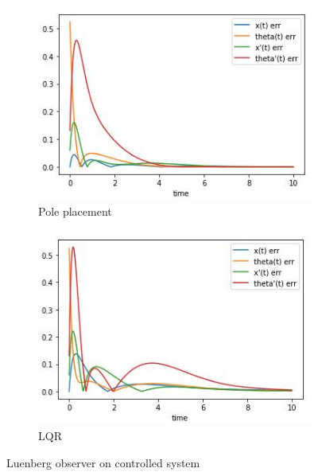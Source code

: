 \documentclass[12pt,letterpaper]{article}
\begin{document}
    \begin{figure}[htb]
        \begin{subfigure}{.5\textwidth}
            \centering
            \includegraphics[width=1\linewidth]{images/luenberg/L_pole_controlled.jpg}
            \caption{Pole placement}
            \label{fig:luenberg_uncontrolled_pole}
        \end{subfigure}
        \begin{subfigure}{.5\textwidth}
          \centering
          \includegraphics[width=1\linewidth]{images/luenberg/L_lqr_controlled.jpg}
          \caption{LQR}
        \label{fig:luenberg_uncontrolled_lqr}
        \end{subfigure}
    \caption{Luenberg observer on controlled system}
    \label{fig:luenberg_controlled}
    \end{figure}
\end{document}
